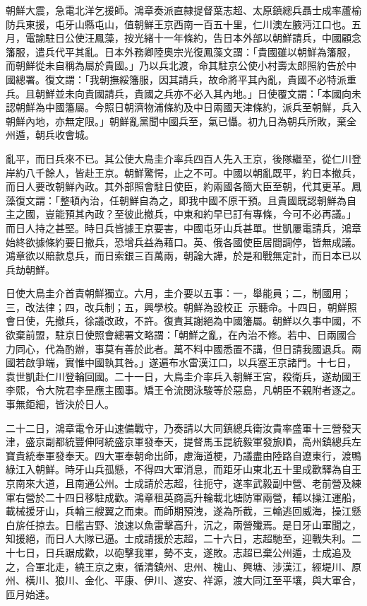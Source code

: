 \begin{pinyinscope}
朝鮮大震，急電北洋乞援師。鴻章奏派直隸提督葉志超、太原鎮總兵聶士成率蘆榆防兵東援，屯牙山縣屯山，值朝鮮王京西南一百五十里，仁川澳左腋沔江口也。五月，電諭駐日公使汪鳳藻，按光緒十一年條約，告日本外部以朝鮮請兵，中國顧念籓服，遣兵代平其亂。日本外務卿陸奧宗光復鳳藻文謂：「貴國雖以朝鮮為籓服，而朝鮮從未自稱為屬於貴國。」乃以兵北渡，命其駐京公使小村壽太郎照約告於中國總署。復文謂：「我朝撫綏籓服，因其請兵，故命將平其內亂，貴國不必特派重兵。且朝鮮並未向貴國請兵，貴國之兵亦不必入其內地。」日使覆文謂：「本國向未認朝鮮為中國籓屬。今照日朝濟物浦條約及中日兩國天津條約，派兵至朝鮮，兵入朝鮮內地，亦無定限。」朝鮮亂黨聞中國兵至，氣已懾。初九日為朝兵所敗，棄全州遁，朝兵收會城。

亂平，而日兵來不已。其公使大鳥圭介率兵四百人先入王京，後隊繼至，從仁川登岸約八千餘人，皆赴王京。朝鮮驚愕，止之不可。中國以朝亂既平，約日本撤兵，而日人要改朝鮮內政。其外部照會駐日使臣，約兩國各簡大臣至朝，代其更革。鳳藻復文謂：「整頓內治，任朝鮮自為之，即我中國不原干預。且貴國既認朝鮮為自主之國，豈能預其內政？至彼此撤兵，中東和約早已訂有專條，今可不必再議。」而日人持之甚堅。時日兵皆據王京要害，中國屯牙山兵甚單。世凱屢電請兵，鴻章始終欲據條約要日撤兵，恐增兵益為藉口。英、俄各國使臣居間調停，皆無成議。鴻章欲以賠款息兵，而日索銀三百萬兩，朝論大譁，於是和戰無定計，而日本已以兵劫朝鮮。

日使大鳥圭介首責朝鮮獨立。六月，圭介要以五事：一，舉能員；二，制國用；三，改法律；四，改兵制；五，興學校。朝鮮為設校正，示聽命。十四日，朝鮮照會日使，先撤兵，徐議改政，不許。復責其謝絕為中國籓屬。朝鮮以久事中國，不欲棄前盟，駐京日使照會總署文略謂：「朝鮮之亂，在內治不修。若中、日兩國合力同心，代為酌辦，事莫有善於此者。萬不料中國悉置不講，但日請我國退兵。兩國若啟爭端，實惟中國執其咎。」遂遍布水雷漢江口，以兵塞王京諸門。十七日，袁世凱赴仁川登輪回國。二十一日，大鳥圭介率兵入朝鮮王宮，殺衛兵，遂劫國王李熙，令大院君李昰應主國事。矯王令流閔泳駿等於惡島，凡朝臣不親附者逐之。事無鉅細，皆決於日人。

二十二日，鴻章電令牙山速備戰守，乃奏請以大同鎮總兵衛汝貴率盛軍十三營發天津，盛京副都統豐伸阿統盛京軍發奉天，提督馬玉昆統毅軍發旅順，高州鎮總兵左寶貴統奉軍發奉天。四大軍奉朝命出師，慮海道梗，乃議盡由陸路自遼東行，渡鴨綠江入朝鮮。時牙山兵孤懸，不得四大軍消息，而距牙山東北五十里成歡驛為自王京南來大道，且南通公州。士成請於志超，往扼守，遂率武毅副中營、老前營及練軍右營於二十四日移駐成歡。鴻章租英商高升輪載北塘防軍兩營，輔以操江運船，載械援牙山，兵輪三艘翼之而東。而師期預洩，遂為所截，三輪逃回威海，操江懸白旂任掠去。日艦吉野、浪速以魚雷擊高升，沉之，兩營殲焉。是日牙山軍聞之，知援絕，而日人大隊已逼。士成請援於志超，二十六日，志超馳至，迎戰失利。二十七日，日兵踞成歡，以砲擊我軍，勢不支，遂敗。志超已棄公州遁，士成追及之，合軍北走，繞王京之東，循清鎮州、忠州、槐山、興塘、涉漢江，經堤川、原州、橫川、狼川、金化、平康、伊川、遂安、祥源，渡大同江至平壤，與大軍合，匝月始達。


\end{pinyinscope}
